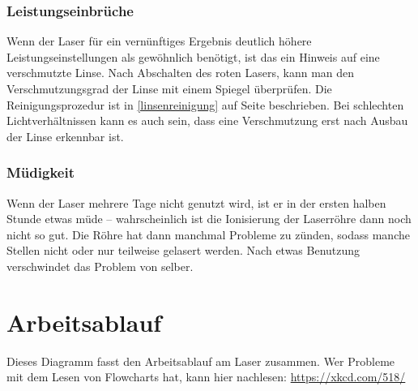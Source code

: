 \documentclass{\basedir/fablab-document}
\begin{document}
\subsubsection{Leistungseinbrüche}
Wenn der Laser für ein vernünftiges Ergebnis deutlich höhere Leistungseinstellungen als gewöhnlich benötigt, ist das ein Hinweis auf eine verschmutzte Linse. Nach Abschalten des roten Lasers, kann man den Verschmutzungsgrad der Linse mit einem Spiegel überprüfen. Die Reinigungsprozedur ist in \ref{linsenreinigung} auf Seite \pageref{linsenreinigung} beschrieben. Bei schlechten Lichtverhältnissen kann es auch sein, dass eine Verschmutzung erst nach Ausbau der Linse erkennbar ist.
\subsubsection{Müdigkeit}
Wenn der Laser mehrere Tage nicht genutzt wird, ist er in der ersten halben Stunde etwas müde -- wahrscheinlich ist die Ionisierung der Laserröhre dann noch nicht so gut. Die Röhre hat dann manchmal Probleme zu zünden, sodass manche Stellen nicht oder nur teilweise gelasert werden. Nach etwas Benutzung verschwindet das Problem von selber.

\section{Arbeitsablauf}
Dieses Diagramm fasst den Arbeitsablauf am Laser zusammen. Wer Probleme mit dem Lesen von Flowcharts hat, kann hier nachlesen: \url{https://xkcd.com/518/}
\end{document}
